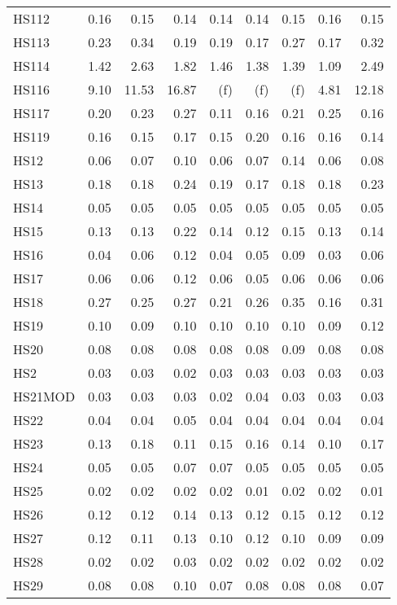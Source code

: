 \documentclass[11pt,twoside]{article}
\begin{document}
{\begin{longtable}[c]{|l|r|r|r|r|r|r|r|r|}
HS112 & 0.16 & 0.15 & 0.14 & 0.14 & 0.14 & 0.15 & 0.16 & 0.15 \\
HS113 & 0.23 & 0.34 & 0.19 & 0.19 & 0.17 & 0.27 & 0.17 & 0.32 \\
HS114 & 1.42 & 2.63 & 1.82 & 1.46 & 1.38 & 1.39 & 1.09 & 2.49 \\
HS116 & 9.10 & 11.53 & 16.87 & (f) & (f) & (f) & 4.81 & 12.18 \\
HS117 & 0.20 & 0.23 & 0.27 & 0.11 & 0.16 & 0.21 & 0.25 & 0.16 \\
HS119 & 0.16 & 0.15 & 0.17 & 0.15 & 0.20 & 0.16 & 0.16 & 0.14 \\
HS12 & 0.06 & 0.07 & 0.10 & 0.06 & 0.07 & 0.14 & 0.06 & 0.08 \\
HS13 & 0.18 & 0.18 & 0.24 & 0.19 & 0.17 & 0.18 & 0.18 & 0.23 \\
HS14 & 0.05 & 0.05 & 0.05 & 0.05 & 0.05 & 0.05 & 0.05 & 0.05 \\
HS15 & 0.13 & 0.13 & 0.22 & 0.14 & 0.12 & 0.15 & 0.13 & 0.14 \\
HS16 & 0.04 & 0.06 & 0.12 & 0.04 & 0.05 & 0.09 & 0.03 & 0.06 \\
HS17 & 0.06 & 0.06 & 0.12 & 0.06 & 0.05 & 0.06 & 0.06 & 0.06 \\
HS18 & 0.27 & 0.25 & 0.27 & 0.21 & 0.26 & 0.35 & 0.16 & 0.31 \\
HS19 & 0.10 & 0.09 & 0.10 & 0.10 & 0.10 & 0.10 & 0.09 & 0.12 \\
HS20 & 0.08 & 0.08 & 0.08 & 0.08 & 0.08 & 0.09 & 0.08 & 0.08 \\
HS2 & 0.03 & 0.03 & 0.02 & 0.03 & 0.03 & 0.03 & 0.03 & 0.03 \\
HS21MOD & 0.03 & 0.03 & 0.03 & 0.02 & 0.04 & 0.03 & 0.03 & 0.03 \\
HS22 & 0.04 & 0.04 & 0.05 & 0.04 & 0.04 & 0.04 & 0.04 & 0.04 \\
HS23 & 0.13 & 0.18 & 0.11 & 0.15 & 0.16 & 0.14 & 0.10 & 0.17 \\
HS24 & 0.05 & 0.05 & 0.07 & 0.07 & 0.05 & 0.05 & 0.05 & 0.05 \\
HS25 & 0.02 & 0.02 & 0.02 & 0.02 & 0.01 & 0.02 & 0.02 & 0.01 \\
HS26 & 0.12 & 0.12 & 0.14 & 0.13 & 0.12 & 0.15 & 0.12 & 0.12 \\
HS27 & 0.12 & 0.11 & 0.13 & 0.10 & 0.12 & 0.10 & 0.09 & 0.09 \\
HS28 & 0.02 & 0.02 & 0.03 & 0.02 & 0.02 & 0.02 & 0.02 & 0.02 \\
HS29 & 0.08 & 0.08 & 0.10 & 0.07 & 0.08 & 0.08 & 0.08 & 0.07 \\

\end{longtable}}
\end{document}
